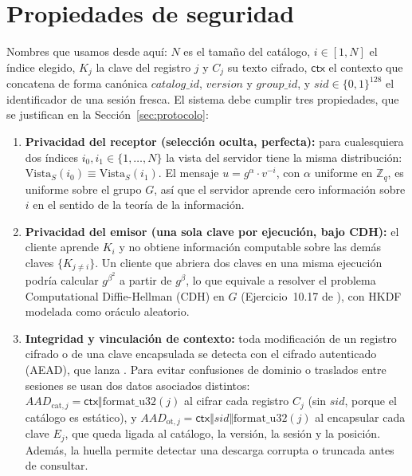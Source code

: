 \section{Propiedades de seguridad}
\label{sec:propiedades}
Nombres que usamos desde aqu\'i: $N$ es el tama\~no del cat\'alogo,
$i\in[1,N]$ el \'indice elegido, $K_j$ la clave del registro $j$ y $C_j$ su
texto cifrado, $\mathsf{ctx}$ el contexto que concatena de forma can\'onica
$\mathit{catalog\_id}$, $\mathit{version}$ y $\mathit{group\_id}$, y
$sid\in\{0,1\}^{128}$ el identificador de una sesi\'on fresca. El sistema
debe cumplir tres propiedades, que se justifican en la
Secci\'on~\ref{sec:protocolo}:

\begin{enumerate}
\item \textbf{Privacidad del receptor (selecci\'on oculta, perfecta):}
para cualesquiera dos \'indices $i_0, i_1 \in \{1,\dots,N\}$ la vista del
servidor tiene la misma distribuci\'on:
$\mathrm{Vista}_S(i_0) \equiv \mathrm{Vista}_S(i_1)$. El mensaje
$u = g^\alpha \cdot v^{-i}$, con $\alpha$ uniforme en $\mathbb{Z}_q$, es
uniforme sobre el grupo $G$, as\'i que el servidor aprende cero informaci\'on
sobre $i$ en el sentido de la teor\'ia de la informaci\'on.

\item \textbf{Privacidad del emisor (una sola clave por ejecuci\'on, bajo
CDH):} el cliente aprende $K_i$ y no obtiene informaci\'on computable sobre
las dem\'as claves $\{K_{j\ne i}\}$. Un cliente que abriera dos claves en una
misma ejecuci\'on podr\'ia calcular $g^{\beta^2}$ a partir de $g^\beta$, lo
que equivale a resolver el problema Computational Diffie-Hellman (CDH) en
$G$ (Ejercicio~10.17 de \cite{boneh-shoup-v06}), con HKDF modelada como
or\'aculo aleatorio.

\item \textbf{Integridad y vinculaci\'on de contexto:} toda modificaci\'on
de un registro cifrado o de una clave encapsulada se detecta con el cifrado
autenticado (AEAD), que lanza . Para evitar confusiones de
dominio o traslados entre sesiones se usan dos datos asociados distintos:
$AAD_{\mathrm{cat}, j} = \mathsf{ctx}\Vert \mathrm{format\_u32}(j)$ al cifrar
cada registro $C_j$ (sin $sid$, porque el cat\'alogo es est\'atico), y
$AAD_{\mathrm{ot}, j} = \mathsf{ctx}\Vert sid\Vert \mathrm{format\_u32}(j)$
al encapsular cada clave $E_j$, que queda ligada al cat\'alogo, la versi\'on,
la sesi\'on y la posici\'on. Adem\'as, la huella  permite
detectar una descarga corrupta o truncada antes de consultar.
\end{enumerate}
